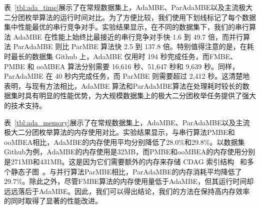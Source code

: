 






表~\ref{tbl:ada_time}展示了在常规数据集上，AdaMBE、ParAdaMBE以及主流极大二分团枚举算法的运行时间对比。为了方便比较，我们使用下划线标记了每个数据集中性能最优的串行竞争对手。实验结果显示，在不同的数据集下，我们的串行算法 AdaMBE 在性能上始终比最接近的串行竞争对手快 1.6 到 49.7 倍，而并行算法 ParAdaMBE 则比 ParMBE 算法快 2.5 到 137.8 倍。特别值得注意的是，在耗时最长的数据集 Github 上，AdaMBE 仅用时 194 秒完成任务，而FMBE、PMBE 和 ooMBEA 算法分别需要 16,616 秒、51,647 秒和 9,639 秒。同样，ParAdaMBE 在 40 秒内完成任务，而 ParMBE 则需要超过 2,412 秒。这清楚地表明，与现有方法相比，AdaMBE 算法和ParAdaMBE算法在处理耗时较长的数据集时具有明显的性能优势，为大规模数据集上的极大二分团枚举任务提供了强大的技术支持。





表~\ref{tbl:ada_memory}展示了在常规数据集上，AdaMBE、ParAdaMBE以及主流极大二分团枚举算法的内存使用对比。实验结果显示，与串行算法PMBE和ooMBEA相比，AdaMBE的内存使用平均分别降低了28.0\%和29.8\%。以数据集Github为例，AdaMBE的内存使用是32MB，而PMBE和ooMBEA的内存使用分别是271MB和431MB。这是因为它们需要额外的内存来存储 CDAG 索引结构~\cite{PMBE20} 和多个静态子图~\cite{ooMBE22}。与并行算法ParMBE相比，ParAdaMBE的内存消耗平均降低了29.7\%。除此之外，尽管FMBE算法的内存使用量低于AdaMBE，但其运行时间却远远落后于AdaMBE。因此，我们可以得出结论，我们的方法在保持高内存效率的同时取得了显著的性能改进。

